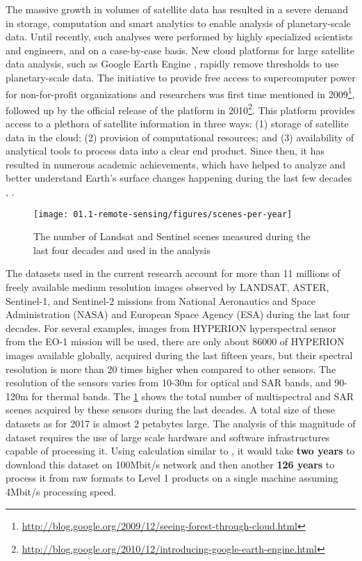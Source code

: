 The massive growth in volumes of satellite data has resulted in a severe demand in storage, computation and smart analytics to enable analysis of planetary-scale data. Until recently, such analyses were performed by highly specialized scientists and engineers, and on a case-by-case basis. New cloud platforms for large satellite data analysis, such as Google Earth Engine \citep{Gorelick2012}, rapidly remove thresholds to use planetary-scale data. The initiative to provide free access to supercomputer power for non-for-profit organizations and researchers was first time mentioned in 2009\footnote{\url{http://blog.google.org/2009/12/seeing-forest-through-cloud.html}}, followed up by the official release of the platform in 2010\footnote{\url{http://blog.google.org/2010/12/introducing-google-earth-engine.html}}. This platform provides access to a plethora of satellite information in three ways: (1) storage of satellite data in the cloud; (2) provision of computational resources; and (3) availability of analytical tools to process data into a clear end product. Since then, it has resulted in numerous academic achievements, which have helped to analyze and better understand Earth's surface changes happening during the last few decades \citep{Hansen2013}, \citep{pekel2016high}.

\begin{figure}
	\centering
	\texttt{[image: 01.1-remote-sensing/figures/scenes-per-year]}
	\caption{The number of Landsat and Sentinel scenes measured during the last four decades and used in the analysis}
	\label{fig:sensor-count}
\end{figure}

The datasets used in the current research account for more than 11 millions of freely available medium resolution images observed by LANDSAT, ASTER, Sentinel-1, and Sentinel-2 missions from National Aeronautics and Space Administration (NASA) and European Space Agency (ESA) during the last four decades. For several examples, images from HYPERION hyperspectral sensor from the EO-1 mission will be used, there are only about 86000 of HYPERION images available globally, acquired during the last fifteen years, but their spectral resolution is more than 20 times higher when compared to other sensors. The resolution of the sensors varies from 10-30m for optical and SAR bands, and 90-120m for thermal bands. The \ref{fig:sensor-count} shows the total number of multispectral and SAR scenes acquired by these sensors during the last decades. A total size of these datasets as for 2017 is almost 2 petabytes large. The analysis of this magnitude of dataset requires the use of large scale hardware and software infrastructures capable of processing it. Using calculation similar to \citep{wagner2015big}, it would take \textbf{two years} to download this dataset on 100Mbit/s network and then another \textbf{126 years} to process it from raw formats to Level 1 products on a single machine assuming 4Mbit/s processing speed.


